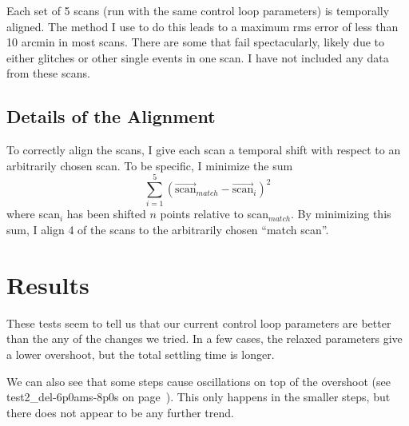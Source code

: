 \documentclass{article}
\begin{document}
Each set of 5 scans (run with the same control loop parameters) is temporally 
aligned.  The method I use to do this leads to a maximum rms error of less than
10 arcmin in most scans.  There are some that fail spectacularly, likely due to
either glitches or other single events in one scan.  I have not included
any data from these scans.

\subsection{Details of the Alignment}
To correctly align the scans, I give each scan a temporal shift with respect to
an arbitrarily chosen scan.  To be specific, I minimize the sum
\begin{equation}
  \sum_{i=1}^{5} \left(\vec{\mathrm{scan}}_{match} - \vec{\mathrm{scan}}_i\right)^2
\end{equation}
where scan$_i$ has been shifted $n$ points relative to scan$_{match}$.
By minimizing this sum, I align 4 of the scans to the arbitrarily chosen 
``match scan''.

\section{Results}
These tests seem to tell us that our current control loop parameters are better
than the any of the changes we tried.  In a few cases, the relaxed parameters
give a lower overshoot, but the total settling time is longer.

We can also see that some steps cause oscillations on top of the overshoot
(see test2\_del-6p0ams-8p0s on page~\pageref{oscillations}).  
This only happens in the smaller steps, but there does not appear to be 
any further trend.

\end{document}
